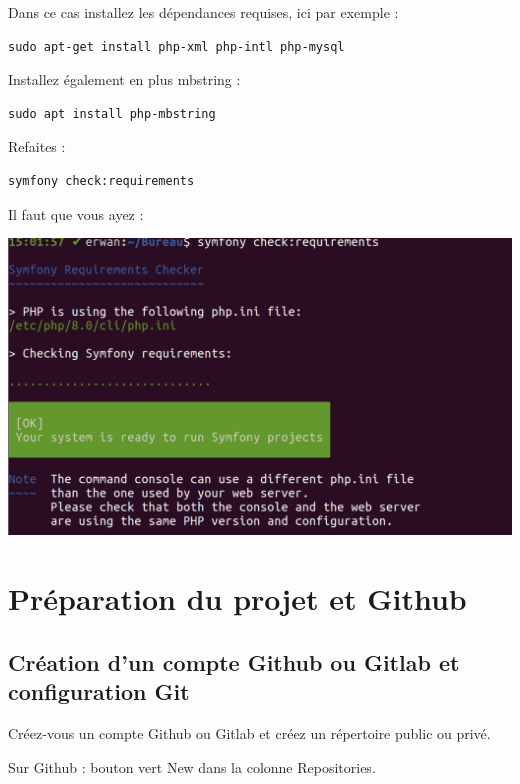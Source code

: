 \documentclass{article}
\begin{document}
Dans ce cas installez les dépendances requises, ici par exemple :
\begin{verbatim}
sudo apt-get install php-xml php-intl php-mysql
\end{verbatim}

Installez également en plus mbstring :
\begin{verbatim}
sudo apt install php-mbstring
\end{verbatim}

Refaites :
\begin{verbatim}
symfony check:requirements
\end{verbatim}

Il faut que vous ayez :

\begin{center}
\includegraphics[width=15cm]{images/image13.png}
\end{center}

\section{Préparation du projet et Github}
\subsection{Création d'un compte Github ou Gitlab et configuration Git}
Créez-vous un compte Github ou Gitlab et créez un répertoire public ou privé.

Sur Github : bouton vert New dans la colonne Repositories.
\end{document}
